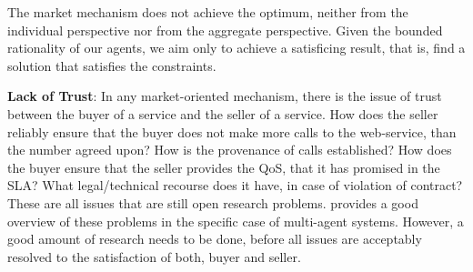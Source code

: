 \documentclass[10pt,journal,compsoc]{IEEEtran}
\begin{document}
The market mechanism does not achieve the optimum, neither from the individual perspective nor from the aggregate perspective. Given the bounded rationality of our agents, we aim only to achieve a satisficing result, that is, find a solution that satisfies the constraints. 

\textbf{Lack of Trust}: In any market-oriented mechanism, there is the issue of trust between the buyer of a service and the seller of a service. How does the seller reliably ensure that the buyer does not make more calls to the web-service, than the number agreed upon? How is the provenance of calls established? How does the buyer ensure that the seller provides the QoS, that it has promised in the SLA? What legal/technical recourse does it have, in case of violation of contract? These are all issues that are still open research problems. \cite{Ramchurn2005Trust} provides a good overview of these problems in the specific case of multi-agent systems. However, a good amount of research needs to be done, before all issues are acceptably resolved to the satisfaction of both, buyer and seller.\\
%
\end{document}
